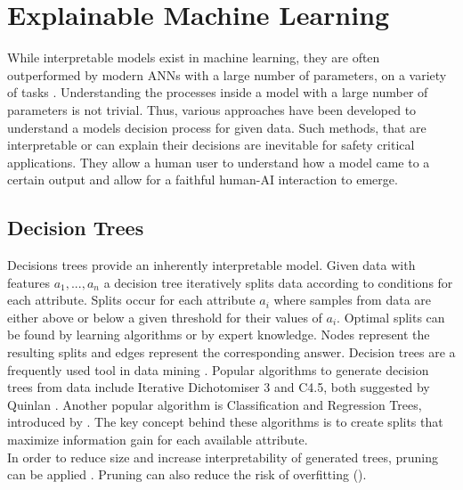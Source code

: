 \documentclass[a4paper,cleardoubleempty,BCOR1cm, 11pt]{report}
\begin{document}
\section{Explainable Machine Learning}
While interpretable models exist in machine learning, they are often outperformed by modern ANNs with a large number of parameters, on a variety of tasks \cite{gunning2019xai, guo2020explainable, sarkar2016accuracy, puiutta2020explainable}. Understanding the processes inside a model with a large number of parameters is not trivial. Thus, various approaches have been developed to understand a models decision process for given data. Such methods, that are interpretable or can explain their decisions are inevitable for safety critical applications. They allow a human user to understand how a model came to a certain output and allow for a faithful human-AI interaction to emerge.


\subsection{Decision Trees}
Decisions trees provide an inherently interpretable model. Given data with features $a_1, ..., a_n$ a decision tree iteratively splits data according to conditions for each attribute. Splits occur for each attribute $a_i$ where samples from data are either above or below a given threshold for their values of $a_i$. Optimal splits can be found by learning algorithms or by expert knowledge. Nodes represent the resulting splits and edges represent the corresponding answer.
Decision trees are a frequently used tool in data mining \cite{wu2008top}. Popular algorithms to generate decision trees from data include Iterative Dichotomiser 3 and C4.5, both suggested by Quinlan \cite{quinlan1986induction,quinlan2014c4}.
Another popular algorithm is Classification and Regression Trees, introduced by \citet{breiman1984classification}. The key concept behind these algorithms is to create splits that maximize information gain for each available attribute.\\
In order to reduce size and increase interpretability of generated trees, pruning can be applied \cite{mingers1989empirical}. Pruning can also reduce the risk of overfitting (\cite{kearns1998fast}).
\end{document}
